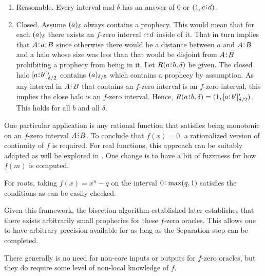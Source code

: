 \documentclass[12pt]{article}
\begin{document}
\begin{enumerate}
\item Reasonable. Every interval and $\delta$ has an answer of $0$ or $(1, c \rint  d)$.

\item Closed. Assume $\halo{a}$ always contains a prophecy. This would mean that for each $\halo{a}$ there exists an $f$-zero interval $c\rint d$ inside of it. That in turn implies that $A \rint  a\rint  B$ since otherwise there would be a distance between $a$ and $A\rint B$ and a halo whose size was less than that would be disjoint from $A\rint B$ prohibiting a prophecy from being in it. Let $R(a\rint b, \delta)$ be given. The closed halo $\clhalo[\delta/2]{a\rint b'}'$ contains $\halo[\delta/5]{a}$ which contains a prophecy by assumption. As any interval in $A\rint B$ that contains an $f$-zero interval is an $f$-zero interval, this implies the close halo is an $f$-zero interval. Hence, $R(a\rint b, \delta) = (1, \clhalo[\delta/2]{a\rint b'}') $. This holds for all $b$ and all $\delta$.

\end{enumerate}

One particular application is any rational function that satisfies being monotonic on an $f$-zero interval $A\rint B$. To conclude that $f(x)=0$, a rationalized version of continuity of $f$ is required. For real functions, this approach can be suitably adapted as will be explored in \cite{taylor23funora}. One change is to have a bit of fuzziness for how $f(m)$ is computed. 

For roots, taking $f(x) = x^n - q$ on the interval $0\rint \max(q, 1)$ satisfies the conditions as can be easily checked. 

Given this framework, the bisection algorithm established later establishes that there exists arbitrarily small prophecies for these $f$-zero oracles. This allows one to have arbitrary precision available for as long as the Separation step can be completed. 

There generally is no need for non-core inputs or outputs for $f$-zero oracles, but they do require some level of non-local knowledge of $f$. 
\end{document}
